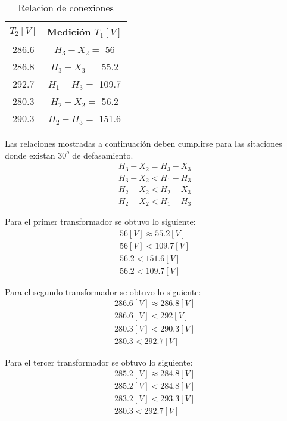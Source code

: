 \documentclass[]{article}
\begin{document}
	\begin{table}[h!]
		\centering
		\begin{tabular}{|c|c|}
			\hline
		$T_2[V]$	& Medición $T_1[V]$  \\ \hline
		286.6	& $H_3-X_2=$ 56 \\ \hline
		286.8	& $H_3-X_3=$ 55.2 \\ \hline
		292.7	& $H_1-H_3=$ 109.7 \\ \hline
		280.3	& $H_2-X_2=$ 56.2 \\ \hline
		290.3	& $H_2-H_3=$ 151.6  \\ \hline
		\end{tabular}
		\caption{Relacion de conexiones}
	\end{table}
	
	Las relaciones mostradas a continuación deben cumplirse para las sitaciones donde existan $30^o$ de defasamiento.\\
	
	\begin{eqnarray}
	H_3-X_2=H_3-X_3\\
	H_3-X_2<H_1-H_3\\
	H_2-X_2<H_2-X_3\\
	H_2-X_2<H_1-H_3
	\end{eqnarray}
	
	Para el primer transformador se obtuvo lo siguiente:\\
	
	\begin{eqnarray}
	56[V]\approx 55.2[V]\\
	56[V]<109.7[V]\\
	56.2<151.6[V]\\
	56.2<109.7[V]
	\end{eqnarray}
	
	Para el segundo transformador se obtuvo lo siguiente:\\
	
	\begin{eqnarray}
	286.6[V] \approx 286.8[V]\\
	286.6[V]<292[V]\\
	280.3[V]<290.3[V]\\
	280.3<292.7[V]
	\end{eqnarray}
	
		Para el tercer transformador se obtuvo lo siguiente:\\
		
		\begin{eqnarray}
		285.2[V] \approx 284.8[V]\\
		285.2[V]<284.8[V]\\
		283.2[V]<293.3[V]\\
		280.3<292.7[V]
		\end{eqnarray}
	
\end{document}
